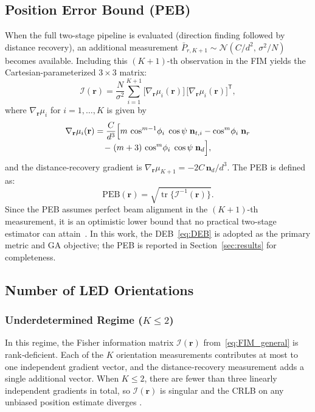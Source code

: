 \documentclass[journal]{IEEEtran}
\newcommand{\added}[1]{{\color{blue}#1}}
\begin{document}
\added{\subsection{Position Error Bound (PEB)}
\label{subsec:PEB}

When the full two-stage pipeline is evaluated (direction finding followed by distance recovery), an additional measurement $\bar P_{r,K+1}\sim\mathcal{N}(C/d^2,\,\sigma^2/N)$ becomes available.  Including this $(K{+}1)$-th observation in the FIM yields the Cartesian-parameterized $3\times3$ matrix:
\begin{equation}
\mathcal{I}(\mathbf r)
= \frac{N}{\sigma^{2}}
  \sum_{i=1}^{K+1}
  \bigl[\nabla_{\mathbf r}\mu_i(\mathbf r)\bigr]\,
  \bigl[\nabla_{\mathbf r}\mu_i(\mathbf r)\bigr]^{\!\mathsf T},
\label{eq:FIM_general}
\end{equation}
where $\nabla_{\mathbf r}\mu_i$ for $i=1,\ldots,K$ is given by
\begin{multline}
    \nabla_{\mathbf r}\mu_i(\mathbf r)
    = \frac{C}{d^{3}}
      \Bigl[
        m\,\cos^{m-1}\!\phi_i\;\cos\psi\;\mathbf n_{t,i}
        -
        \cos^{m}\!\phi_i\;\mathbf n_{r}
    \\[-3pt]
        -\;
        (m+3)\,\cos^{m}\!\phi_i\;\cos\psi\;\mathbf n_{d}
      \Bigr],
    \label{eq:grad_mu_closed}
\end{multline}
and the distance-recovery gradient is $\nabla_{\mathbf r}\mu_{K+1} = -2C\,\mathbf n_d/d^3$.  The PEB is defined as:
\begin{equation}
\mathrm{PEB}(\mathbf r)
= \sqrt{\operatorname{tr}\!\bigl\{\mathcal{I}^{-1}(\mathbf r)\bigr\}}.
\label{eq:PEB}
\end{equation}
Since the PEB assumes perfect beam alignment in the $(K{+}1)$-th measurement, it is an optimistic lower bound that no practical two-stage estimator can attain~\cite{Kay1993}.  In this work, the DEB~\eqref{eq:DEB} is adopted as the primary metric and GA objective; the PEB is reported in Section~\ref{sec:results} for completeness.}

\subsection{Number of LED Orientations}
\label{subsec:Kchoice}

\subsubsection{Underdetermined Regime (\(K\le2\))}
In this regime, the Fisher information matrix
\(\mathcal{I}(\mathbf r)\) from~\eqref{eq:FIM_general} is rank‐deficient.
Each of the \(K\) orientation measurements contributes at most to one
independent gradient vector, and the distance‐recovery measurement adds
a single additional vector.  When \(K\le2\), there are fewer than three
linearly independent gradients in total, so \(\mathcal{I}(\mathbf r)\) is
singular and the CRLB on any unbiased position estimate diverges
\cite{Zhuang2018}.
\end{document}

